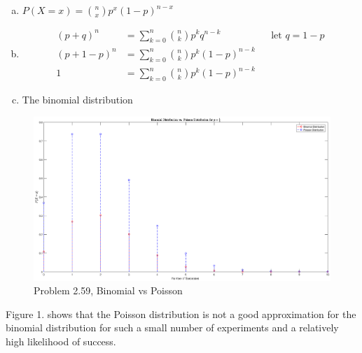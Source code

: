 \documentclass[12pt]{article}
\newenvironment{problem}[2][Problem]{\begin{trivlist}
\item[\hskip \labelsep {\bfseries #1}\hskip \labelsep {\bfseries #2.}]
  \vspace{1 cm}
}{\end{trivlist}}
\begin{document}
\begin{problem}{2.57} 
\item
  \begin{enumerate}[a.]
    \item %
      $P(X=x) = \binom{n}{x}p^x(1-p)^{n-x}$
    \item %
      \begin{align*}
        (p+q)^n &= \sum_{k=0}^{n} \binom{n}{k}p^kq^{n-k} & & \textrm{let } q = 1-p \\
        (p+1-p)^n &= \sum_{k=0}^{n} \binom{n}{k}p^k(1-p)^{n-k} \\
        1 &= \sum_{k=0}^{n} \binom{n}{k}p^k(1-p)^{n-k} 
    \end{align*}
      \item %
        The binomial distribution
  \end{enumerate}
\end{problem}

\begin{problem}{2.59} 
  \item %
    \begin{figure}[htpb]
      \centering
        \includegraphics[width=\textwidth,height=\textheight,keepaspectratio]{problem_2_59.eps}
        \caption{Problem 2.59, Binomial vs Poisson}
    \end{figure}
\item %
  Figure 1. shows that the Poisson distribution is not a good approximation
  for the binomial distribution for such a small number of experiments and a
  relatively high likelihood of success.
\end{problem} 
\end{document}
